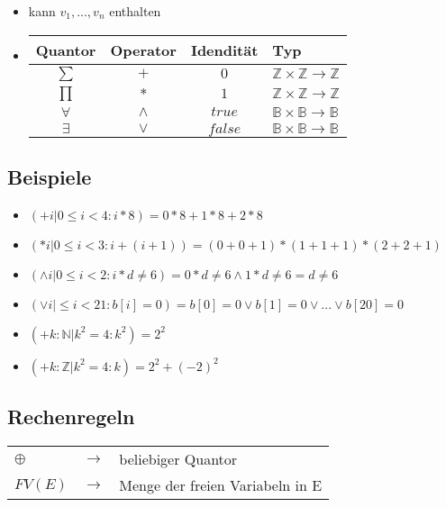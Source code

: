 \documentclass[a4paper,10pt]{article}
\newcommand{\BN}{\mathbb{B}} %
\newcommand{\NN}{\mathbb{N}} %
\newcommand{\ZN}{\mathbb{Z}} %
\newcommand{\ra}{\rightarrow}
\begin{document}
\begin{description}
\begin{itemize}
		\item kann $v_1, ..., v_n$ enthalten
		\item \begin{tabular}{ c c c l }
				  Quantor & Operator & Idendit\"at & Typ \\
				  \hline 
				  $\sum$ & $+$ & $0$ & $\ZN \times \ZN \ra \ZN$  \\
				  $\prod$ & $*$ & $1$ & $\ZN \times \ZN \ra \ZN$  \\
				  $\forall$ & $\wedge$ & $true$ & $\BN \times \BN \ra \BN$  \\
				  $\exists$ & $\vee$ & $false$ & $\BN \times \BN \ra \BN$ \\
			\end{tabular}
	\end{itemize}
\end{description}

\subsection{Beispiele}
\begin{itemize} 
	\item $(+ i | 0 \leq i < 4:i*8) = 0*8 + 1*8 + 2 *8$
	\item $(* i | 0 \leq i < 3:i+(i+1)) =(0 + 0 + 1) * (1 + 1 + 1) * (2 + 2 + 1)$
	\item $(\wedge i | 0 \leq i < 2:i*d \neq 6) = 0*d \neq 6 \wedge 1*d \neq 6 = d \neq 6$  
	\item $(\vee i| \leq i < 21:b[i]=0) = b[0] = 0 \vee b[1] = 0 \vee ... \vee b[20] = 0$
	\item $(+k:\NN | k^2=4:k^2)=2^2$
	\item $(+k:\ZN | k^2=4:k)=2^2 + (-2)^2$
\end{itemize}

\subsection{Rechenregeln}
\begin{tabular}{l c l}
	$\oplus$ & $\ra$ & beliebiger Quantor \\
	$FV(E)$ & $\ra$ & Menge der freien Variabeln in E
\end{tabular}
\end{document}
